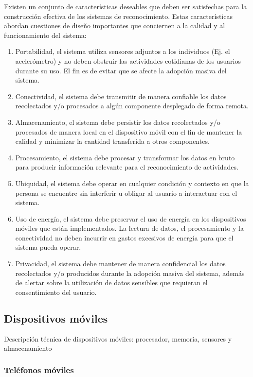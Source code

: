 \label{ssec46:caracteristicas}Existen un conjunto de características
deseables que deben ser satisfechas para la construcción efectiva
de los sistemas de reconocimiento. Estas características abordan cuestiones
de diseño importantes que conciernen a la calidad y al funcionamiento
del sistema:
\begin{enumerate}
\item Portabilidad, el sistema utiliza sensores adjuntos a los individuos
(Ej. el acelerómetro) y no deben obstruir las actividades cotidianas
de los usuarios durante su uso. El fin es de evitar que se afecte
la adopción masiva del sistema. 
\item Conectividad, el sistema debe transmitir de manera confiable los datos
recolectados y/o procesados a algún componente desplegado de forma
remota. 
\item Almacenamiento, el sistema debe persistir los datos recolectados y/o
procesados de manera local en el dispositivo móvil con el fin de mantener
la calidad y minimizar la cantidad transferida a otros componentes.
\item Procesamiento, el sistema debe procesar y transformar los datos en
bruto para producir información relevante para el reconocimiento de
actividades.
\item Ubiquidad, el sistema debe operar en cualquier condición y contexto
en que la persona se encuentre sin interferir u obligar al usuario
a interactuar con el sistema.
\item Uso de energía, el sistema debe preservar el uso de energía en los
dispositivos móviles que están implementados. La lectura de datos,
el procesamiento y la conectividad no deben incurrir en gastos excesivos
de energía para que el sistema pueda operar.
\item Privacidad, el sistema debe mantener de manera confidencial los datos
recolectados y/o producidos durante la adopción masiva del sistema,
además de alertar sobre la utilización de datos sensibles que requieran
el consentimiento del usuario.
\end{enumerate}

\subsection{Dispositivos móviles}

\label{ssec46:dispositivos-moviles}Descripción técnica de dispositivos
móviles: procesador, memoria, sensores y almacenamiento

\subsubsection{Teléfonos móviles}

